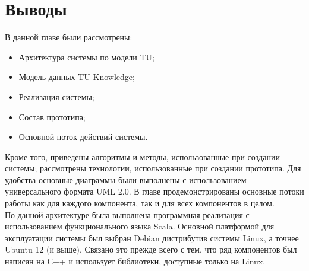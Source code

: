 \section{Выводы}
В данной главе были рассмотрены:
\begin{itemize}
	\item Архитектура системы по модели TU;
	\item Модель данных TU Knowledge;
	\item Реализация системы;
	\item Состав прототипа;
	\item Основной поток действий системы.
\end{itemize} \par
Кроме того, приведены алгоритмы и методы, использованные при создании системы; рассмотрены технологии, использованные при создании прототипа. Для удобства основные диаграммы были выполнены с использованием универсального формата UML 2.0. В главе продемонстрированы основные потоки работы как для каждого компонента, так и для всех компонентов в целом. \\
По данной архитектуре была выполнена программная реализация с использованием функционального языка Scala. Основной платформой для эксплуатации системы был выбран Debian дистрибутив системы Linux, а точнее Ubuntu 12 (и выше). Связано это прежде всего с тем, что ряд компонентов был написан на С++ и использует библиотеки, доступные только на Linux.    


\clearpage